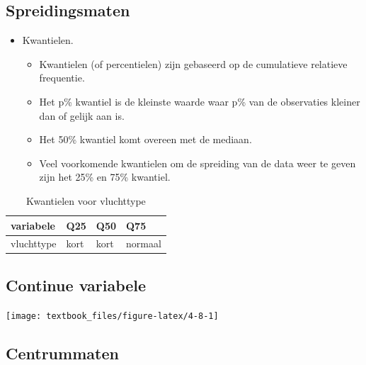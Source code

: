 \documentclass[]{tufte-book}
\providecommand{\tightlist}{%
  \setlength{\itemsep}{0pt}\setlength{\parskip}{0pt}}
\begin{document}
\hypertarget{spreidingsmaten}{%
\subsection*{Spreidingsmaten}\label{spreidingsmaten}}

\begin{itemize}
\tightlist
\item
  Kwantielen.

  \begin{itemize}
  \tightlist
  \item
    Kwantielen (of percentielen) zijn gebaseerd op de cumulatieve relatieve frequentie.
  \item
    Het p\% kwantiel is de kleinste waarde waar p\% van de observaties kleiner dan of gelijk aan is.
  \item
    Het 50\% kwantiel komt overeen met de mediaan.
  \item
    Veel voorkomende kwantielen om de spreiding van de data weer te geven zijn het 25\% en 75\% kwantiel.
  \end{itemize}
\end{itemize}

\begin{table}

\caption{\label{tab:4-7}Kwantielen voor vluchttype}
\centering
\fontsize{10}{12}\selectfont
\begin{tabular}[t]{llll}
\toprule
variabele & Q25 & Q50 & Q75\\
\midrule
vluchttype & kort & kort & normaal\\
\bottomrule
\end{tabular}
\end{table}

\hypertarget{continue-variabele-1}{%
\subsection{Continue variabele}\label{continue-variabele-1}}

\texttt{[image: textbook\_files/figure-latex/4-8-1]}

\hypertarget{centrummaten-1}{%
\subsection*{Centrummaten}\label{centrummaten-1}}
\end{document}
